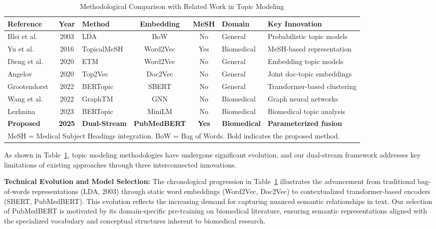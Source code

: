 \documentclass[authorproof,JACIII,researchpaper]{fujipressarticle}
\begin{document}
\begin{table}[!t]
\centering
\caption{Methodological Comparison with Related Work in Topic Modeling}
\label{tab:comparison}
\renewcommand{\arraystretch}{1.3}
\begin{tabular}{lclccll}
\hline
\textbf{Reference} & \textbf{Year} & \textbf{Method} & \textbf{Embedding} & \textbf{MeSH} & \textbf{Domain} & \textbf{Key Innovation} \\
\hline
Blei et al.~\cite{blei_latent_2003} & 2003 & LDA & BoW & No & General & Probabilistic topic models \\
Yu et al.~\cite{yu_improving_2016} & 2016 & TopicalMeSH & Word2Vec & Yes & Biomedical & MeSH-based representation \\
Dieng et al.~\cite{dieng_topic_2020} & 2020 & ETM & Word2Vec & No & General & Embedding topic models \\
Angelov~\cite{angelov_top2vec_2020} & 2020 & Top2Vec & Doc2Vec & No & General & Joint doc-topic embeddings \\
Grootendorst~\cite{grootendorst_bertopic_2022} & 2022 & BERTopic & SBERT & No & General & Transformer-based clustering \\
Wang et al.~\cite{wang_graph-embedded_2022} & 2022 & GraphTM & GNN & No & Biomedical & Graph neural networks \\
Lezhnina~\cite{lezhnina_depression_2023} & 2023 & BERTopic & MiniLM & No & Biomedical & Biomedical topic analysis \\
\hline
\textbf{Proposed} & \textbf{2025} & \textbf{Dual-Stream} & \textbf{PubMedBERT} & \textbf{Yes} & \textbf{Biomedical} & \textbf{Parameterized fusion} \\
\hline
\multicolumn{7}{l}{\footnotesize MeSH = Medical Subject Headings integration. BoW = Bag of Words. Bold indicates the proposed method.} \\
\end{tabular}
\end{table}

As shown in Table~\ref{tab:comparison}, topic modeling methodologies have undergone significant evolution, and our dual-stream framework addresses key limitations of existing approaches through three interconnected innovations.

\textbf{Technical Evolution and Model Selection:} The chronological progression in Table~\ref{tab:comparison} illustrates the advancement from traditional bag-of-words representations (LDA, 2003) through static word embeddings (Word2Vec, Doc2Vec) to contextualized transformer-based encoders (SBERT, PubMedBERT). This evolution reflects the increasing demand for capturing nuanced semantic relationships in text. Our selection of PubMedBERT is motivated by its domain-specific pre-training on biomedical literature, ensuring semantic representations aligned with the specialized vocabulary and conceptual structures inherent to biomedical research.
\end{document}
